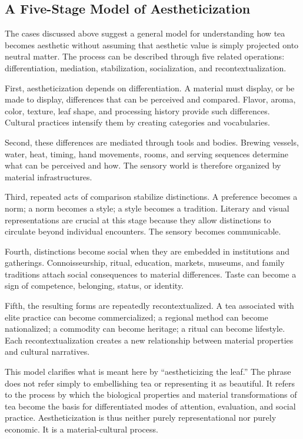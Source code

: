 \documentclass[numbers]{IntechOpen-Book}
\begin{document}
\subsection{A Five-Stage Model of Aestheticization}

The cases discussed above suggest a general model for understanding how tea becomes aesthetic without assuming that aesthetic value is simply projected onto neutral matter. The process can be described through five related operations: differentiation, mediation, stabilization, socialization, and recontextualization.

First, aestheticization depends on differentiation. A material must display, or be made to display, differences that can be perceived and compared. Flavor, aroma, color, texture, leaf shape, and processing history provide such differences. Cultural practices intensify them by creating categories and vocabularies.

Second, these differences are mediated through tools and bodies. Brewing vessels, water, heat, timing, hand movements, rooms, and serving sequences determine what can be perceived and how. The sensory world is therefore organized by material infrastructures.

Third, repeated acts of comparison stabilize distinctions. A preference becomes a norm; a norm becomes a style; a style becomes a tradition. Literary and visual representations are crucial at this stage because they allow distinctions to circulate beyond individual encounters. The sensory becomes communicable.

Fourth, distinctions become social when they are embedded in institutions and gatherings. Connoisseurship, ritual, education, markets, museums, and family traditions attach social consequences to material differences. Taste can become a sign of competence, belonging, status, or identity.

Fifth, the resulting forms are repeatedly recontextualized. A tea associated with elite practice can become commercialized; a regional method can become nationalized; a commodity can become heritage; a ritual can become lifestyle. Each recontextualization creates a new relationship between material properties and cultural narratives.

This model clarifies what is meant here by ``aestheticizing the leaf.'' The phrase does not refer simply to embellishing tea or representing it as beautiful. It refers to the process by which the biological properties and material transformations of tea become the basis for differentiated modes of attention, evaluation, and social practice. Aestheticization is thus neither purely representational nor purely economic. It is a material-cultural process.
\end{document}
